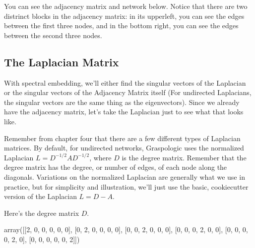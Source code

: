 \documentclass[letterpaper,10pt,english]{jupyterBook}
\begin{document}
\sphinxAtStartPar
You can see the adjacency matrix and network below. Notice that there are two distrinct blocks in the adjacency matrix: in its upper\sphinxhyphen{}left, you can see the edges between the first three nodes, and in the bottom right, you can see the edges between the second three nodes.

\noindent{}


\subsection{The Laplacian Matrix}
\label{\detokenize{representations/ch6/spectral-embedding:the-laplacian-matrix}}
\sphinxAtStartPar
With spectral embedding, we’ll either find the singular vectors of the Laplacian or the singular vectors of the Adjacency Matrix itself (For undirected Laplacians, the singular vectors are the same thing as the eigenvectors). Since we already have the adjacency matrix, let’s take the Laplacian just to see what that looks like.

\sphinxAtStartPar
Remember from chapter four that there are a few different types of Laplacian matrices. By default, for undirected networks, Graspologic uses the normalized Laplacian \(L = D^{-1/2} A D^{-1/2}\), where \(D\) is the degree matrix. Remember that the degree matrix has the degree, or number of edges, of each node along the diagonals. Variations on the normalized Laplacian are generally what we use in practice, but for simplicity and illustration, we’ll just use the basic, cookie\sphinxhyphen{}cutter version of the Laplacian \(L = D - A\).

\sphinxAtStartPar
Here’s the degree matrix \(D\).

\begin{sphinxVerbatim}[commandchars=\\\{\}]
   
  
\end{sphinxVerbatim}

\begin{sphinxVerbatim}[commandchars=\\\{\}]
array([[2, 0, 0, 0, 0, 0],
       [0, 2, 0, 0, 0, 0],
       [0, 0, 2, 0, 0, 0],
       [0, 0, 0, 2, 0, 0],
       [0, 0, 0, 0, 2, 0],
       [0, 0, 0, 0, 0, 2]])
\end{sphinxVerbatim}
\end{document}
